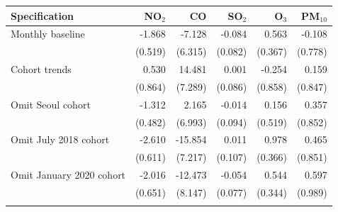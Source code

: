 \begin{tabular}{lrrrrr}
\toprule
Specification & NO$_2$ & CO & SO$_2$ & O$_3$ & PM$_{10}$ \\
\midrule
Monthly baseline & -1.868 & -7.128 & -0.084 & 0.563 & -0.108 \\
 & (0.519) & (6.315) & (0.082) & (0.367) & (0.778) \\
\addlinespace[3pt]
Cohort trends & 0.530 & 14.481 & 0.001 & -0.254 & 0.159 \\
 & (0.864) & (7.289) & (0.086) & (0.858) & (0.847) \\
\addlinespace[3pt]
Omit Seoul cohort & -1.312 & 2.165 & -0.014 & 0.156 & 0.357 \\
 & (0.482) & (6.993) & (0.094) & (0.519) & (0.852) \\
\addlinespace[3pt]
Omit July 2018 cohort & -2.610 & -15.854 & 0.011 & 0.978 & 0.465 \\
 & (0.611) & (7.217) & (0.107) & (0.366) & (0.851) \\
\addlinespace[3pt]
Omit January 2020 cohort & -2.016 & -12.473 & -0.054 & 0.544 & 0.597 \\
 & (0.651) & (8.147) & (0.077) & (0.344) & (0.989) \\
\addlinespace[3pt]
\bottomrule
\end{tabular}
